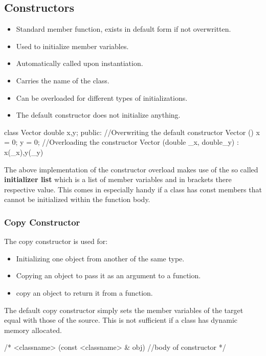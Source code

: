 \documentclass[10pt,a4paper]{scrartcl}
\begin{document}
\begin{multicols*}{2}
\subsection{Constructors}

\begin{itemize}
\item Standard member function, exists in default form if not overwritten.
\item Used to initialize member variables.
\item Automatically called upon instantiation.
\item Carries the name of the class.
\item Can be overloaded for different types of initializations.
\item The default constructor does not initialize anything.
\end{itemize}

\begin{TPCpp}
class Vector {
	double x,y;
public:
	//Overwriting the default constructor
	Vector (){
		x = 0;
		y = 0;
	}
	//Overloading the constructor
	Vector (double _x, double_y)
		: x(_x),y(_y) {}
}
\end{TPCpp}

The above implementation of the constructor overload makes use of the so called \textbf{initializer list} which is a list of member variables and in brackets there respective value. This comes in especially handy if a class has const members that cannot be initialized within the function body.

\subsubsection{Copy Constructor}

The copy constructor is used for:

\begin{itemize}
\item Initializing one object from another of the same type.
\item Copying an object to pass it as an argument to a function.
\item copy an object to return it from a function.
\end{itemize}

The default copy constructor simply sets the member variables of the target equal with those of the source. This is not sufficient if a class has dynamic memory allocated.

\begin{TPCpp}
/*
<classname> (const <classname> & obj) {
	//body of constructor
}
*/


\end{TPCpp}
\end{multicols*}
\end{document}
